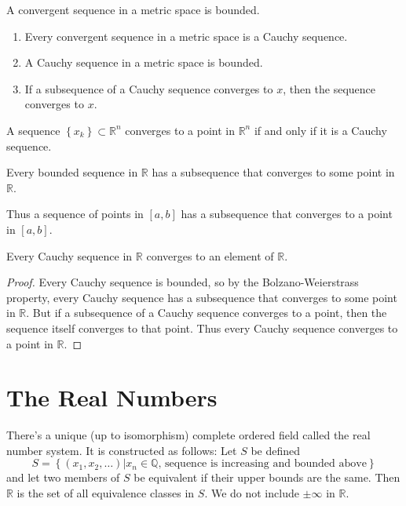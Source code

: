 \documentclass[twoside,10pt]{report}
\begin{document}
\begin{prop}
	A convergent sequence in a metric space is bounded.
\end{prop}

\begin{prop}
	\begin{enumerate}
		\item Every convergent sequence in a metric space is a Cauchy sequence.
		\item A Cauchy sequence in a metric space is bounded.
		\item If a subsequence of a Cauchy sequence converges to $x$, then the sequence converges to $x$.
	\end{enumerate}
\end{prop}

\begin{thrm}{}{}
	A sequence $\left\{ x_k \right\} \subset \mathbb{R}^n$ converges to a point in $\mathbb{R}^n$ if and only if it is a Cauchy sequence.
\end{thrm}

\begin{thrm}
	Every bounded sequence in $\mathbb{R}$ has a subsequence that converges to some point in $\mathbb{R}$.
\end{thrm}

Thus a sequence of points in $[a,b]$ has a subsequence that converges to a point in $[a,b]$.

\begin{thrm}[]
	Every Cauchy sequence in $\mathbb{R}$ converges to an element of $\mathbb{R}$.
\end{thrm}
\begin{proof}
Every Cauchy sequence is bounded, so by the Bolzano-Weierstrass property, every Cauchy sequence has a subsequence that converges to some point in $\mathbb{R}$. But if a subsequence of a Cauchy sequence converges to a point, then the sequence itself converges to that point. Thus every Cauchy sequence converges to a point in $\mathbb{R}$.
\end{proof}


\section{The Real Numbers}

\begin{thrm}[]
	There's a unique (up to isomorphism) complete ordered field called the real number system. It is constructed as follows:
	Let $S$ be defined
	\[
		S = \left\{ (x_1, x_2, \dots) | x_n \in \mathbb{Q} \text{, sequence is increasing and bounded above} \right\}
	\] 
	and let two members of $S$ be equivalent if their upper bounds are the same. Then $\mathbb{R}$ is the set of all equivalence classes in $S$. We do not include $\pm \infty$ in $\mathbb{R}$.
\end{thrm}
\end{document}
